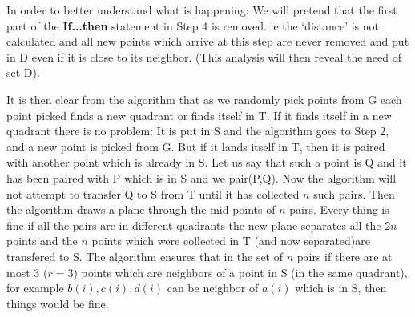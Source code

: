 \documentclass[english]{article}
\begin{document}
In order to better understand what is happening: We will pretend that
the first part of the \textbf{If...then} statement in Step 4 is removed.
ie the `distance' is not calculated and all new points which arrive
at this step are never removed and put in D even if it is close to
its neighbor. (This analysis will then reveal the need of set D).

It is then clear from the algorithm that as we randomly pick points
from G each point picked finds a new quadrant or finds itself in T.
If it finds itself in a new quadrant there is no problem: It is put
in S and the algorithm goes to Step 2, and a new point is picked from
G. But if it lands itself in T, then it is paired with another point
which is already in S. Let us say that such a point is Q and it has
been paired with P which is in S and we pair(P,Q). Now the algorithm
will not attempt to transfer Q to S from T until it has collected
$n$ such pairs. Then the algorithm draws a plane through the mid
points of $n$ pairs. Every thing is fine if all the pairs are in
different quadrants the new plane separates all the $2n$ points and
the $n$ points which were collected in T (and now separated)are transfered
to S. The algorithm ensures that in the set of $n$ pairs if there
are at most 3 ($r=3$) points which are neighbors of a point in S (in the same quadrant), for example $b(i),c(i),d(i)$ can be neighbor of $a(i)$ which is in S, then things would be fine.
\end{document}
